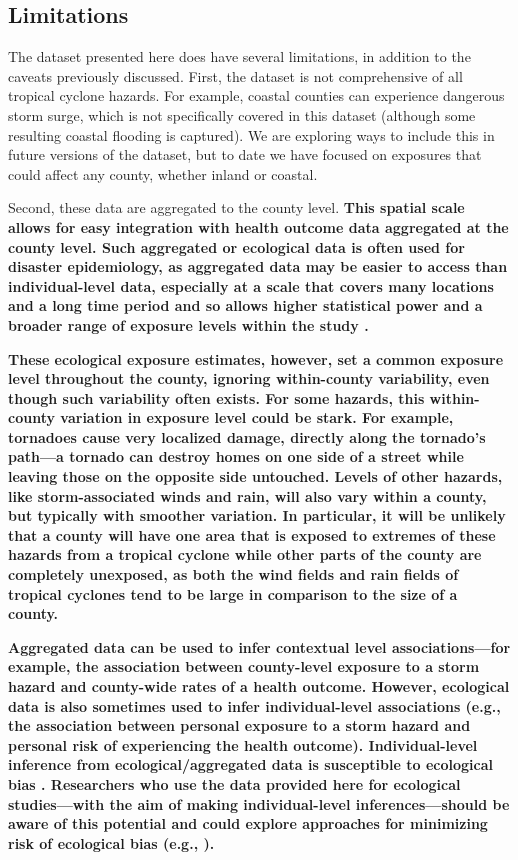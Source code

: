 \subsection*{Limitations}

The dataset presented here does have several limitations, in addition to the
caveats previously discussed. First, the dataset is not comprehensive of all
tropical cyclone hazards. For example, coastal counties can experience
dangerous storm surge, which is not specifically covered in this dataset
(although some resulting coastal flooding is captured). We are exploring ways
to include this in future versions of the dataset, but to date we have focused
on exposures that could affect any county, whether inland or coastal.  

Second, these data are aggregated to the county level. \textbf{This spatial
scale allows for easy integration with health outcome data aggregated at the
county level. Such aggregated or ecological data is often used for disaster
epidemiology, as aggregated data may be easier to access than individual-level
data, especially at a scale that covers many locations and a long time period
and so allows higher statistical power and a broader range of exposure levels
within the study \parencite{wakefield2008overcoming}.}

\textbf{These ecological exposure estimates, however, set a common exposure
level throughout the county, ignoring within-county variability, even though
such variability often exists. For some hazards, this within-county variation
in exposure level could be stark. For example, tornadoes cause very localized
damage, directly along the tornado's path---a tornado can destroy homes on one
side of a street while leaving those on the opposite side untouched. Levels of
other hazards, like storm-associated winds and rain, will also vary within a
county, but typically with smoother variation. In particular, it will be
unlikely that a county will have one area that is exposed to extremes of these
hazards from a tropical cyclone while other parts of the county are completely
unexposed, as both the wind fields and rain fields of tropical cyclones tend to
be large in comparison to the size of a county.}

\textbf{Aggregated data can be used to infer contextual level
associations---for example, the association between county-level exposure to a
storm hazard and county-wide rates of a health outcome. However, ecological
data is also sometimes used to infer individual-level associations (e.g., the
association between personal exposure to a storm hazard and personal risk of
experiencing the health outcome). Individual-level inference from
ecological/aggregated data is susceptible to ecological bias
\parencite{greenland1994invited, portnov2007ecological, idrovo2011three}.
Researchers who use the data provided here for ecological studies---with the
aim of making individual-level inferences---should be aware of this potential
and could explore approaches for minimizing risk of ecological bias (e.g.,
\cite{wakefield2008overcoming}).}

